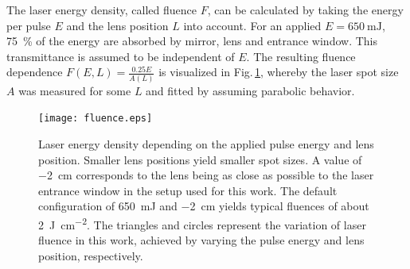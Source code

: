 The laser energy density, called fluence $F$, can be calculated by taking the energy per pulse $E$ and the lens position $L$ into account.
For an applied $E=\qty{650}{\milli\joule}$, \qty{75}{\percent} of the energy are absorbed by mirror, lens and entrance window.
This transmittance is assumed to be independent of $E$.
The resulting fluence dependence $F(E,L)=\frac{0.25E}{A(L)}$ is visualized in Fig.\,\ref{Fig:Methods_fluence}, whereby the laser spot size $A$ was measured for some $L$ and fitted by assuming parabolic behavior.

\begin{figure}
    \centering
    \texttt{[image: fluence.eps]}
    \caption{Laser energy density depending on the applied pulse energy and lens position. Smaller lens positions yield smaller spot sizes. A value of \qty{-2}{\cm} corresponds to the lens being as close as possible to the laser entrance window in the setup used for this work.
    The default configuration of \qty{650}{\milli\joule} and \qty{-2}{cm} yields typical fluences of about \qty{2}{\J\per\square\cm}.
    The triangles and circles represent the variation of laser fluence in this work, achieved by varying the pulse energy and lens position, respectively.}
    \label{Fig:Methods_fluence}
\end{figure}

